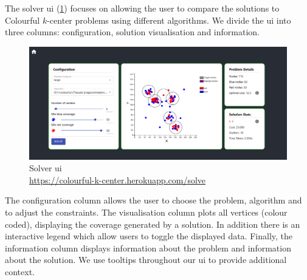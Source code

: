 The solver \acrshort{ui} (\cref{fig:sol_vis}) focuses on allowing the user to compare the solutions to Colourful $k$-center problems using different algorithms. We divide the \acrshort{ui} into three columns: configuration, solution visualisation and information. 

\begin{figure}[H]
    \centering
    \includegraphics[width=\textwidth]{images/solver_ui/colourful_solve_zoom.png}
    \caption{Solver \acrshort{ui}\\\url{https://colourful-k-center.herokuapp.com/solve}}
    \label{fig:sol_vis}
\end{figure}

The configuration column allows the user to choose the problem, algorithm and to adjust the constraints. The visualisation column plots all vertices (colour coded), displaying the coverage generated by a solution. In addition there is an interactive legend which allow users to toggle the displayed data. Finally, the information column displays information about the problem and information about the solution. We use tooltips throughout our \acrshort{ui} to provide additional context.